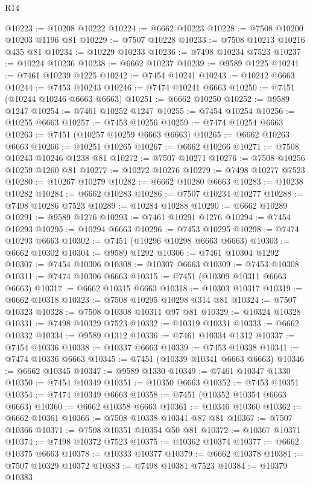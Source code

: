 \begin{lexlean}{R14}
\begin{coremodule}
{{{{{{{{{{{{{{{{{{{{{{{{{{{{{{{{{{{{{{{{{{{{{{{{{{{{{{{{{{{{{{{{{{{{{{{{{{{{{{{{{{@10223 := @10208 @10222
@10224 := @6662 @10223
@10228 := @7508 @10200 @10203 @1196 @81
@10229 := @7507 @10228
@10233 := @7508 @10213 @10216 @435 @81
@10234 := @10229 @10233
@10236 := @7498 @10234 @7523
@10237 := @10224 @10236
@10238 := @6662 @10237
@10239 := @9589 @1225
@10241 := @7461 @10239 @1225
@10242 := @7454 @10241
@10243 := @10242 @6663
@10244 := @7453 @10243
@10246 := @7474 @10241 @6663
@10250 := @7451 (@10244 @10246 @6663 @6663)
@10251 := @6662 @10250
@10252 := @9589 @1247
@10254 := @7461 @10252 @1247
@10255 := @7454 @10254
@10256 := @10255 @6663
@10257 := @7453 @10256
@10259 := @7474 @10254 @6663
@10263 := @7451 (@10257 @10259 @6663 @6663)
@10265 := @6662 @10263 @6663
@10266 := @10251 @10265
@10267 := @6662 @10266
@10271 := @7508 @10243 @10246 @1238 @81
@10272 := @7507 @10271
@10276 := @7508 @10256 @10259 @1260 @81
@10277 := @10272 @10276
@10279 := @7498 @10277 @7523
@10280 := @10267 @10279
@10282 := @6662 @10280 @6663
@10283 := @10238 @10282
@10284 := @6662 @10283
@10286 := @7507 @10234 @10277
@10288 := @7498 @10286 @7523
@10289 := @10284 @10288
@10290 := @6662 @10289
@10291 := @9589 @1276
@10293 := @7461 @10291 @1276
@10294 := @7454 @10293
@10295 := @10294 @6663
@10296 := @7453 @10295
@10298 := @7474 @10293 @6663
@10302 := @7451 (@10296 @10298 @6663 @6663)
@10303 := @6662 @10302
@10304 := @9589 @1292
@10306 := @7461 @10304 @1292
@10307 := @7454 @10306
@10308 := @10307 @6663
@10309 := @7453 @10308
@10311 := @7474 @10306 @6663
@10315 := @7451 (@10309 @10311 @6663 @6663)
@10317 := @6662 @10315 @6663
@10318 := @10303 @10317
@10319 := @6662 @10318
@10323 := @7508 @10295 @10298 @314 @81
@10324 := @7507 @10323
@10328 := @7508 @10308 @10311 @97 @81
@10329 := @10324 @10328
@10331 := @7498 @10329 @7523
@10332 := @10319 @10331
@10333 := @6662 @10332
@10334 := @9589 @1312
@10336 := @7461 @10334 @1312
@10337 := @7454 @10336
@10338 := @10337 @6663
@10339 := @7453 @10338
@10341 := @7474 @10336 @6663
@10345 := @7451 (@10339 @10341 @6663 @6663)
@10346 := @6662 @10345
@10347 := @9589 @1330
@10349 := @7461 @10347 @1330
@10350 := @7454 @10349
@10351 := @10350 @6663
@10352 := @7453 @10351
@10354 := @7474 @10349 @6663
@10358 := @7451 (@10352 @10354 @6663 @6663)
@10360 := @6662 @10358 @6663
@10361 := @10346 @10360
@10362 := @6662 @10361
@10366 := @7508 @10338 @10341 @87 @81
@10367 := @7507 @10366
@10371 := @7508 @10351 @10354 @50 @81
@10372 := @10367 @10371
@10374 := @7498 @10372 @7523
@10375 := @10362 @10374
@10377 := @6662 @10375 @6663
@10378 := @10333 @10377
@10379 := @6662 @10378
@10381 := @7507 @10329 @10372
@10383 := @7498 @10381 @7523
@10384 := @10379 @10383
}}}}}}}}}}}}}}}}}}}}}}}}}}}}}}}}}}}}}}}}}}}}}}}}}}}}}}}}}}}}}}}}}}}}}}}}}}}}}}}}}}
\end{coremodule}
\end{lexlean}
